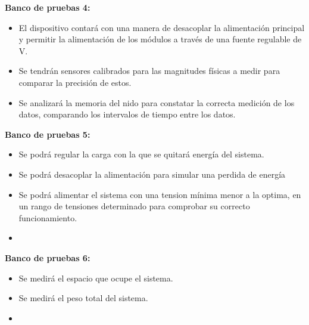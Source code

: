 \textbf{Banco de pruebas 4:}
\begin{itemize}
	\item El dispositivo contará con una manera de desacoplar la alimentación principal y permitir la alimentación de los módulos a través de una fuente regulable de \TBD V.%
	\item Se tendrán sensores calibrados para las magnitudes físicas a medir para comparar la precisión de estos.
	\item Se analizará la memoria del nido para constatar la correcta medición de los datos, comparando los intervalos de tiempo entre los datos.
\end{itemize}

\textbf{Banco de pruebas 5:}
\begin{itemize}
	\item Se podrá regular la carga con la que se quitará energía del sistema.
	\item Se podrá desacoplar la alimentación para simular una perdida de energía
	\item Se podrá alimentar el sistema con una tension mínima menor a la optima, en un rango de tensiones determinado para comprobar su correcto funcionamiento.
	\item \TBC
\end{itemize}

\textbf{Banco de pruebas 6:}
\begin{itemize}
	\item Se medirá el espacio que ocupe el sistema.
	\item Se medirá el peso total del sistema.
	\item \TBC
\end{itemize}